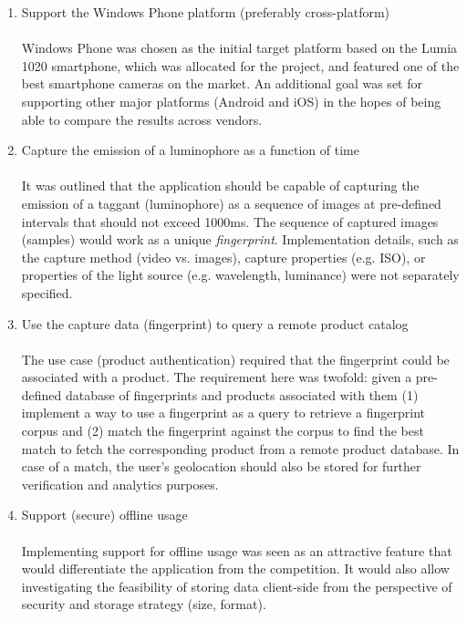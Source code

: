 \documentclass[thesis.tex]{subfiles}
\begin{document}
\begin{enumerate}[leftmargin=0.55in, label=\textbf{R\arabic*}]
	\item \label{R1} Support the Windows Phone platform (preferably cross-platform)\\ \\
	Windows Phone was chosen as the initial target platform based on the Lumia 1020 smartphone, which was allocated for the project, and featured one of the best smartphone cameras on the market. An additional goal was set for supporting other major platforms (Android and iOS) in the hopes of being able to compare the results across vendors.

    \item \label{R2} Capture the emission of a luminophore as a function of time\\ \\
    It was outlined that the application should be capable of capturing the emission of a taggant (luminophore) as a sequence of images at pre-defined intervals that should not exceed 1000ms. The sequence of captured images (samples) would work as a unique \emph{fingerprint}. Implementation details, such as the capture method (video vs. images), capture properties (e.g. ISO), or properties of the light source (e.g. wavelength, luminance) were not separately specified.

    \item \label{R3} Use the capture data (fingerprint) to query a remote product catalog\\ \\
    The use case (product authentication) required that the fingerprint could be associated with a product. The requirement here was twofold: given a pre-defined database of fingerprints and products associated with them (1) implement a way to use a fingerprint as a query to retrieve a fingerprint corpus and (2) match the fingerprint against the corpus to find the best match to fetch the corresponding product from a remote product database. In case of a match, the user's geolocation should also be stored for further verification and analytics purposes.

	\item \label{R4} Support (secure) offline usage\\ \\
	Implementing support for offline usage was seen as an attractive feature that would differentiate the application from the competition. It would also allow investigating the feasibility of storing data client-side from the perspective of security and storage strategy (size, format).
\end{enumerate}
\end{document}
